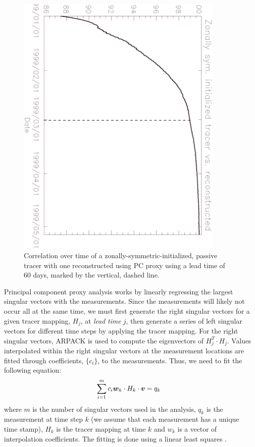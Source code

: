 \begin{figure}
\begin{center}
\includegraphics[angle=90, width=0.9\textwidth]{proxycorr.eps}
\caption{Correlation over time of a zonally-symmetric-initialized, passive tracer
with one reconstructed using PC proxy using a lead time of 60 days,
marked by the vertical, dashed line.}\label{PCproxytest}
\end{center}
\end{figure}

Principal component proxy analysis works by linearly regressing the
largest singular vectors with the measurements.
Since the measurements will likely not occur all at the same time,
we must first generate the right singular vectors for a given tracer 
mapping, $H_j$, at \textit{lead time} $j$, then generate a series of
left singular vectors for different time steps
by applying the tracer mapping.
For the right singular vectors, ARPACK is used to compute the
eigenvectors of $H_j^T\cdot H_j$.
Values interpolated within the right singular vectors at the 
measurement locations are fitted
through coefficients, $\lbrace c_i \rbrace$, to the measurements.
Thus, we need to fit the following equation:
\begin{equation}
\sum_{i=1}^m c_i \boldsymbol w_k \cdot H_k \cdot \boldsymbol v = q_k
\end{equation}
where $m$ is the number of singular vectors used in the analysis,
$q_k$ is the measurement at time step $k$ (we assume that each measurement
has a unique time stamp), $H_k$ is the tracer mapping at time $k$
and $w_k$ is a vector of interpolation coefficients.
The fitting is done using a linear least squares \citep{gsl_ref}.

